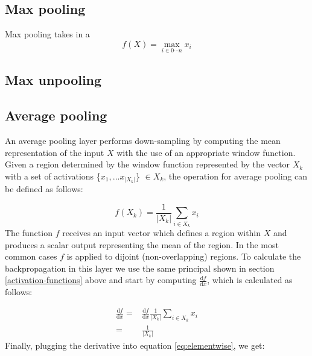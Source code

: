 \documentclass[a4paper]{article}
\begin{document}
\subsection{Max pooling}
Max pooling takes in a 
\begin{equation}
f(X)=\max\limits_{i \in 0 \cdots n} x_i
\end{equation}


\subsection{Max unpooling}
\subsection{Average pooling}

An average pooling layer performs down-sampling by computing the mean representation of the input $X$ with the use of an appropriate window function. Given a region determined by the window function represented by the vector $X_k$ with a set of activations \{$x_1,... x_{|X_k|}$\} $\in X_k$, the operation for average pooling can be defined as follows:

\begin{equation}
f(X_k) = \frac{1}{|X_k|}\sum\limits_{i \in X_k} x_{i} 
\end{equation}
The function $f$ receives an input vector which defines a region within $X$ and produces a scalar output representing the mean of the region. In the most common cases $f$ is applied to dijoint (non-overlapping) regions. To calculate the backpropagation in this layer we use the same principal shown in section \ref{activation-functions} above and start by computing $\frac{\mathrm{d}f}{\mathrm{d}x}$, which is calculated as follows:

\begin{align}
\frac{\mathrm{d}f}{\mathrm{d}x} 
= & \frac{\mathrm{d}f}{\mathrm{d}x} \frac{1}{|X_k|}\sum\limits_{i \in X_k} x_{i}  \\
= & \frac{1}{|X_k|}
\end{align}
Finally, plugging the derivative into equation \ref{eq:elementwise}, we get:
\end{document}
